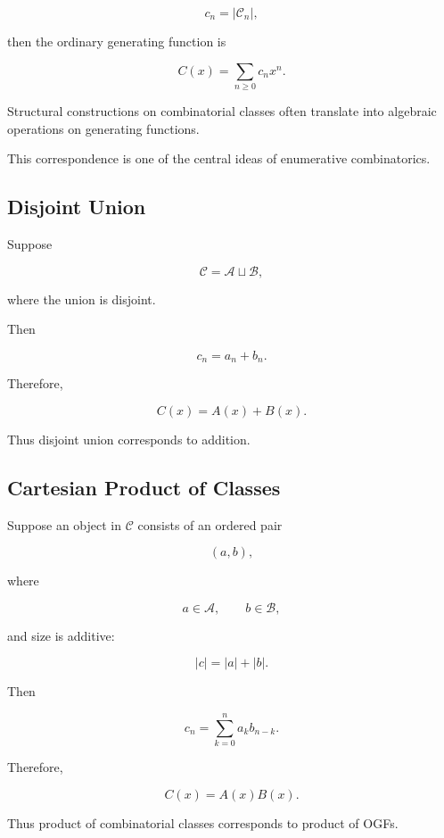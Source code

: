 \[
c_n
=
|\mathcal{C}_n|,
\]

then the ordinary generating function is

\[
\boxed{
C(x)
=
\sum_{n\geq0}c_nx^n.
}
\]

Structural constructions on combinatorial classes often translate into
algebraic operations on generating functions.

This correspondence is one of the central ideas of enumerative
combinatorics.

\subsection{Disjoint Union}
\label{subsec:gf-disjoint-union}

Suppose

\[
\mathcal{C}
=
\mathcal{A}\sqcup\mathcal{B},
\]

where the union is disjoint.

Then

\[
c_n=a_n+b_n.
\]

Therefore,

\[
\boxed{
C(x)
=
A(x)+B(x).
}
\]

Thus disjoint union corresponds to addition.

\subsection{Cartesian Product of Classes}
\label{subsec:gf-product-classes}

Suppose an object in \(\mathcal{C}\) consists of an ordered pair

\[
(a,b),
\]

where

\[
a\in\mathcal{A},
\qquad
b\in\mathcal{B},
\]

and size is additive:

\[
|c|=|a|+|b|.
\]

Then

\[
c_n
=
\sum_{k=0}^{n}a_kb_{n-k}.
\]

Therefore,

\[
\boxed{
C(x)=A(x)B(x).
}
\]

Thus product of combinatorial classes corresponds to product of OGFs.

